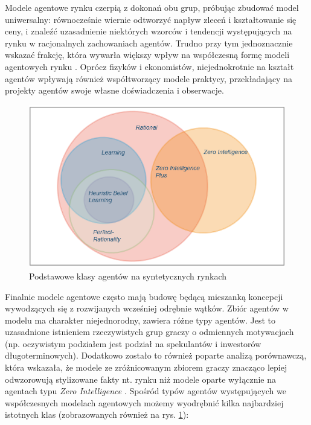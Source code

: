 {Modele agentowe rynku czerpią z dokonań obu grup, próbując zbudować model uniwersalny: równocześnie wiernie odtworzyć napływ zleceń i kształtowanie się ceny, i znaleźć uzasadnienie niektórych wzorców i tendencji występujących na rynku w racjonalnych zachowaniach agentów. Trudno przy tym jednoznacznie wskazać frakcję, która wywarła większy wpływ na współczesną formę modeli agentowych rynku \cite{lobbib}. Oprócz fizyków i ekonomistów, niejednokrotnie na kształt agentów wpływają również współtworzący modele praktycy, przekładający na projekty agentów swoje własne doświadczenia i obserwacje.
\begin{center}
\begin{figure}
\begin{center}
\includegraphics[scale=0.85]{agenci_venn.png}
\end{center}
\caption{Podstawowe klasy agentów na syntetycznych rynkach}\label{fig:agentsvenn}
\end{figure}
\end{center}
Finalnie modele agentowe często mają budowę będącą mieszanką koncepcji wywodzących się z rozwijanych wcześniej odrębnie wątków. Zbiór agentów w modelu ma charakter niejednorodny, zawiera różne typy agentów. Jest to uzasadnione istnieniem rzeczywistych grup graczy o odmiennych motywacjach (np. oczywistym podziałem jest podział na spekulantów i inwestorów długoterminowych). Dodatkowo zostało to również poparte analizą porównawczą, która wskazała, że modele ze zróżnicowanym zbiorem graczy znacząco lepiej odwzorowują stylizowane fakty nt. rynku niż modele oparte wyłącznie na agentach typu \textit{Zero Intelligence} \cite{getreal}. Spośród typów agentów występujących we współczesnych modelach agentowych możemy wyodrębnić kilka najbardziej istotnych klas (zobrazowanych również na rys. \ref{fig:agentsvenn}): 
}
